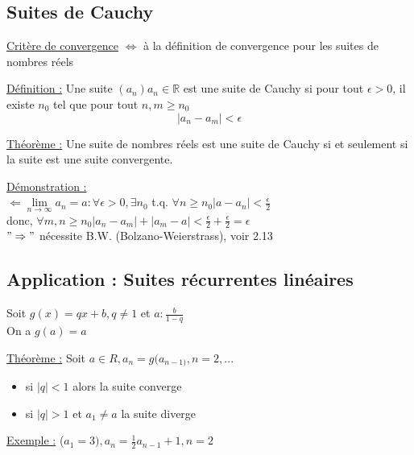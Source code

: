 \documentclass[12pt,a4paper]{article}
\newcommand{\limite}{\lim\limits_}
\newcommand{\ninf}{\ensuremath{n \to \infty}}
\newcommand{\R}{\ensuremath{\mathbb{R}} }
\begin{document}
{\subsection{Suites de Cauchy}
\underline{Critère de convergence} $\Leftrightarrow$ à la définition de convergence pour les suites de nombres réels
\begin{boite}
\underline{Définition :} Une suite $(a_n) a_n \in \R$ est une suite de Cauchy si pour tout $\epsilon > 0$, il existe $n_0$ tel que pour tout $n,m \geq n_0$\\
\begin{equation}
|a_n-a_m| < \epsilon
\end{equation}
\end{boite}
\begin{boite}
\underline{Théorème :} Une suite de nombres réels est une suite de Cauchy si et seulement si la suite est une suite convergente.
\end{boite}
\underline{Démonstration :}\\
$\Leftarrow \limite{\ninf} a_n = a: \forall \epsilon > 0, \exists n_0$ t.q. $\forall n \geq n_0 |a-a_n| < \frac{\epsilon}{2}$\\
donc, $\forall m,n \geq n_0 |a_n - a_m| + |a_m -a| < \frac{\epsilon}{2}+ \frac{\epsilon}{2} = \epsilon$\\
$"\Rightarrow"$ nécessite B.W. (Bolzano-Weierstrass), voir 2.13
\subsection{Application : Suites récurrentes linéaires} 
Soit $g(x) = qx + b, q \neq 1$ et $a:\frac{b}{1-q}$\\
On a $g(a) = a$
\begin{boite}
\underline{Théorème :} Soit $a\in R, a_n = g(a_{n-1)}, n = 2,...$
\begin{itemize}
\item si $|q| < 1$ alors la suite converge
\item si $|q| > 1$ et $a_1 \neq a$ la suite diverge
\end{itemize}
\end{boite}
\underline{Exemple :} ($a_1 = 3), a_n = \frac{1}{2} a_{n-1} + 1, n=2$

}
\end{document}
